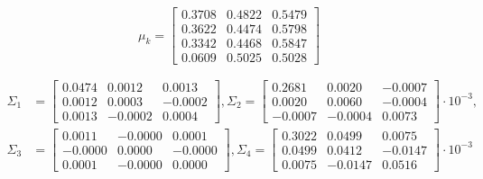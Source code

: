 \documentclass{ethz_report}
\begin{document}
\begin{equation}
    \mu_k = \begin{bmatrix}
        0.3708 & 0.4822 & 0.5479 \\
        0.3622 & 0.4474 & 0.5798 \\
        0.3342 & 0.4468 & 0.5847 \\
        0.0609 & 0.5025 & 0.5028
    \end{bmatrix}
\end{equation}

\begin{equation}
    \begin{split}
        \Sigma_1&= \begin{bmatrix}
            0.0474 & 0.0012 & 0.0013 \\
            0.0012 & 0.0003 &-0.0002 \\
            0.0013 &-0.0002 & 0.0004
        \end{bmatrix},
        \Sigma_2= \begin{bmatrix}
            0.2681 &  0.0020 & -0.0007 \\
            0.0020 &  0.0060 & -0.0004 \\
            -0.0007 & -0.0004 &  0.0073
        \end{bmatrix} \cdot 10^{-3}, \\
        \Sigma_3&= \begin{bmatrix}
            0.0011 & -0.0000 &  0.0001 \\
            -0.0000 &  0.0000 & -0.0000 \\
            0.0001 & -0.0000 &  0.0000
        \end{bmatrix},
        \Sigma_4= \begin{bmatrix}
            0.3022 &  0.0499 &  0.0075 \\
            0.0499 &  0.0412 & -0.0147 \\
            0.0075 & -0.0147 &  0.0516
        \end{bmatrix} \cdot 10^{-3}
    \end{split}
\end{equation}
\end{document}
